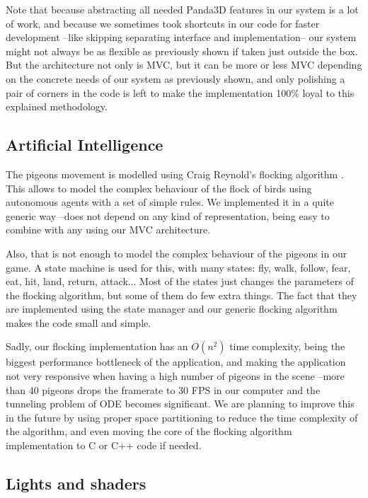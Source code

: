 \documentclass[a4paper,10pt]{article}
\begin{document}
Note that because abstracting all needed Panda3D features in our
system is a lot of work, and because we sometimes took shortcuts in
our code for faster development --like skipping separating interface
and implementation-- our system might not always be as flexible as
previously shown if taken just outside the box. But the architecture not
only is MVC, but it can be more or less MVC depending on the concrete
needs of our system as previously shown, and only polishing a pair of
corners in the code is left to make the implementation 100\% loyal to
this explained methodology.

\subsection{Artificial Intelligence}

The pigeons movement is modelled using Craig Reynold's flocking
algorithm \cite{smed06algo}\cite{reynolds87flocks}. This allows to model the
complex behaviour of the flock of birds using autonomous agents with a
set of simple rules. We implemented it in a quite generic way --does not
depend on any kind of representation, being easy to combine with any
using our MVC architecture.

Also, that is not enough to model the complex behaviour of the
pigeons in our game. A state machine is used for this, with many states: fly,
walk, follow, fear, eat, hit, land, return, attack... Most of the
states just changes the parameters of the flocking algorithm, but some
of them do few extra things. The fact that they are implemented using
the state manager and our generic flocking algorithm makes the code
small and simple.

Sadly, our flocking implementation has an $O(n^2)$ time complexity,
being the biggest performance bottleneck of the application, and
making the application not very responsive when having a high number
of pigeons in the scene --more than 40 pigeons drops the framerate to
30 FPS in our computer and the tunneling problem of ODE becomes
significant. We are planning to improve this in the future by using
proper space partitioning to reduce the time complexity of the
algorithm, and even moving the core of the flocking
algorithm implementation to C or C++ code if needed.

\subsection{Lights and shaders}
\end{document}
